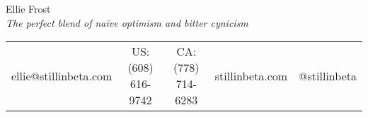\centering
\textmd{\Huge Ellie Frost} \\
{\it The perfect blend of na\"ive optimism and bitter cynicism}
\begin{tabular}{c | c | c | c | c}
ellie@stillinbeta.com &
US: (608) 616-9742 &
CA: (778) 714-6283 &
stillinbeta.com &
@stillinbeta
\end{tabular}

\raggedright
